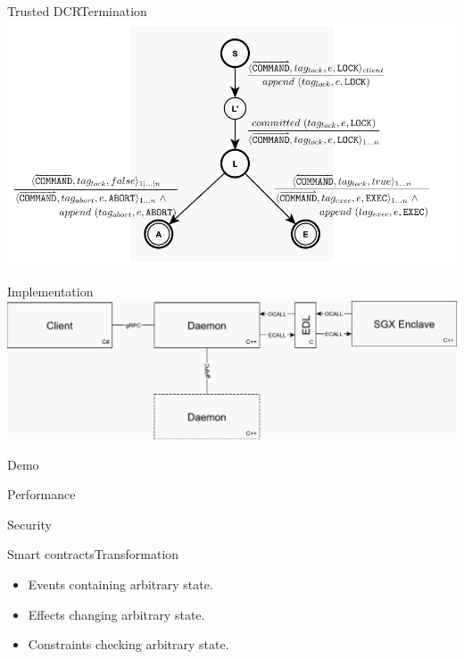 \documentclass{beamer}
\begin{document}
\begin{frame}{Trusted DCR}{Termination}%
  \vfill
  \includegraphics[width=\textwidth]{figures/raft-2pc.pdf}
  \vfill
\end{frame}

\begin{frame}{Implementation}%
  \vfill
  \includegraphics[width=\textwidth]{figures/network-stack.pdf}
  \vfill
\end{frame}

\begin{frame}{Demo}%
    
\end{frame}

\begin{frame}{Performance}%
    
\end{frame}

\begin{frame}{Security}%
    
\end{frame}

\begin{frame}{Smart contracts}{Transformation}%
    \begin{itemize}
    	\item Events containing arbitrary state.
    	\item Effects changing arbitrary state.
    	\item Constraints checking arbitrary state.
    \end{itemize}
\end{frame}
\end{document}
